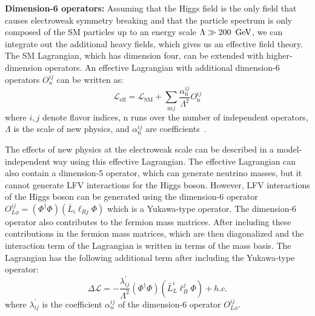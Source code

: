 \textbf{Dimension-6 operators:} Assuming that the Higgs field is the only field that causes electroweak symmetry breaking and that the particle spectrum is only composed of the SM particles up to an energy scale $\Lambda \gg 200~\,\text{Ge\hspace{-.08em}V}$, we can integrate out the additional heavy fields, which gives us an effective field theory. The SM Lagrangian, which has dimension four, can be extended with higher-dimension operators. An effective Lagrangian with additional dimension-6 operators $O_{n}^{i j}$ can be written as:
%
\begin{equation}
  \mathcal{L}_{\text{eff}}=\mathcal{L}_{\text{SM}}+\sum_{\text{n}ij} \frac{\alpha_{\text{n}}^{ij}}{\Lambda^2} O_{\text{n}}^{i j}
\end{equation}
%
where $i, j$ denote flavor indices, n runs over the number of independent operators, $\Lambda$ is the scale of new physics, and $\alpha_{\text{n}}^{i j}$ are coefficients~\cite{DiazCruz:1999xe}.

The effects of new physics at the electroweak scale can be described in a model-independent way using this effective Lagrangian. The effective Lagrangian can also contain a dimension-5 operator, which can generate neutrino masses, but it cannot generate LFV interactions for the Higgs boson. However, LFV interactions of the Higgs boson can be generated using the dimension-6 operator $O_{L \phi}^{i j}=(\Phi^{\dagger} \Phi)(\bar{L}_{i} \ell_{R j} \Phi)$ which is a Yukawa-type operator. The dimension-6 operator also contributes to the fermion mass matrices. After including these contributions in the fermion mass matrices, which are then diagonalized and the interaction term of the Lagrangian is written in terms of the mass basis. The Lagrangian has the following additional term after including the Yukawa-type operator:
%
\begin{equation}
  \Delta \mathcal{L}=-\frac{\lambda_{i j}^{\prime}}{\Lambda^2}(\Phi^{\dagger} \Phi)(\bar{L}_{L}^{i} \ell_{R}^{j} \Phi)+h.c.
\end{equation}
%
where $\lambda_{i j}^{\prime}$ is the coefficient $\alpha_{n}^{i j}$ of the dimension-6 operator $O_{L \phi}^{i j}$.

